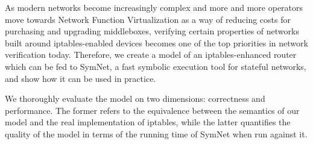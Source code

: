 
As modern networks become increasingly complex and more and more operators move
towards Network Function Virtualization as a way of reducing costs for
purchasing and upgrading middleboxes, verifying certain properties of networks
built around iptables-enabled devices becomes one of the top priorities in
network verification today.  Therefore, we create a model of an
iptables-enhanced router which can be fed to SymNet, a fast symbolic execution
tool for stateful networks, and show how it can be used in practice.

We thoroughly evaluate the model on two dimensions: correctness and
performance.  The former refers to the equivalence between the semantics of our
model and the real implementation of iptables, while the latter quantifies the
quality of the model in terms of the running time of SymNet when run against
it.
